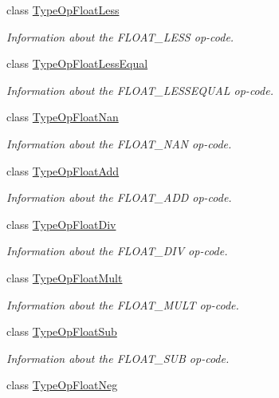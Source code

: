 \begin{DoxyCompactItemize}
class \mbox{\hyperlink{class_type_op_float_less}{Type\+Op\+Float\+Less}}
\begin{DoxyCompactList}\small\item\em Information about the F\+L\+O\+A\+T\+\_\+\+L\+E\+SS op-\/code. \end{DoxyCompactList}\item 
class \mbox{\hyperlink{class_type_op_float_less_equal}{Type\+Op\+Float\+Less\+Equal}}
\begin{DoxyCompactList}\small\item\em Information about the F\+L\+O\+A\+T\+\_\+\+L\+E\+S\+S\+E\+Q\+U\+AL op-\/code. \end{DoxyCompactList}\item 
class \mbox{\hyperlink{class_type_op_float_nan}{Type\+Op\+Float\+Nan}}
\begin{DoxyCompactList}\small\item\em Information about the F\+L\+O\+A\+T\+\_\+\+N\+AN op-\/code. \end{DoxyCompactList}\item 
class \mbox{\hyperlink{class_type_op_float_add}{Type\+Op\+Float\+Add}}
\begin{DoxyCompactList}\small\item\em Information about the F\+L\+O\+A\+T\+\_\+\+A\+DD op-\/code. \end{DoxyCompactList}\item 
class \mbox{\hyperlink{class_type_op_float_div}{Type\+Op\+Float\+Div}}
\begin{DoxyCompactList}\small\item\em Information about the F\+L\+O\+A\+T\+\_\+\+D\+IV op-\/code. \end{DoxyCompactList}\item 
class \mbox{\hyperlink{class_type_op_float_mult}{Type\+Op\+Float\+Mult}}
\begin{DoxyCompactList}\small\item\em Information about the F\+L\+O\+A\+T\+\_\+\+M\+U\+LT op-\/code. \end{DoxyCompactList}\item 
class \mbox{\hyperlink{class_type_op_float_sub}{Type\+Op\+Float\+Sub}}
\begin{DoxyCompactList}\small\item\em Information about the F\+L\+O\+A\+T\+\_\+\+S\+UB op-\/code. \end{DoxyCompactList}\item 
class \mbox{\hyperlink{class_type_op_float_neg}{Type\+Op\+Float\+Neg}}

\end{DoxyCompactItemize}
